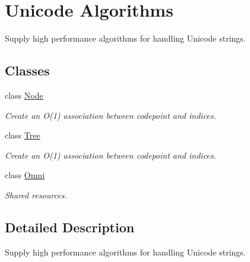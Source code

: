 \hypertarget{group__jlettvin}{}\section{Unicode Algorithms}
\label{group__jlettvin}


Supply high performance algorithms for handling Unicode strings.  


\subsection*{Classes}
\begin{DoxyCompactItemize}
\item 
class \hyperlink{class_node}{Node}
\begin{DoxyCompactList}\small\item\em Create an O(1) association between codepoint and indices. \end{DoxyCompactList}\item 
class \hyperlink{class_tree}{Tree}
\begin{DoxyCompactList}\small\item\em Create an O(1) association between codepoint and indices. \end{DoxyCompactList}\item 
class \hyperlink{class_omni}{Omni}
\begin{DoxyCompactList}\small\item\em Shared resources. \end{DoxyCompactList}\end{DoxyCompactItemize}


\subsection{Detailed Description}
Supply high performance algorithms for handling Unicode strings. 

